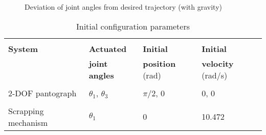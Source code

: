{\begin{figure}[t!]
	\begin{center}
	\hspace{1pt}
	\end{center}
\caption{Deviation of joint angles from desired trajectory (with gravity)}
\label{fig:c5error_results_c5g}
\end{figure}
	\begin{table}[b!]
		\centering
		\caption{Initial configuration parameters}
		\label{tab2:initial_config}
		\begin{tabular}{l|lll}
			\hline\\
			\textbf{System} & \textbf{Actuated} & \textbf{Initial} & \textbf{Initial}\\
			& \textbf{joint angles} & \textbf{position} (rad) & \textbf{velocity} (rad/s)\\
			\hline\\
			2-DOF pantograph & $\theta_1$, $\theta_3$ & $\pi$/2, 0 & 0, 0\\
			\hline\\
			Scrapping mechanism & $\theta_1$ & 0 & 10.472\\
			\hline		
		\end{tabular}
	\end{table}
	
}
